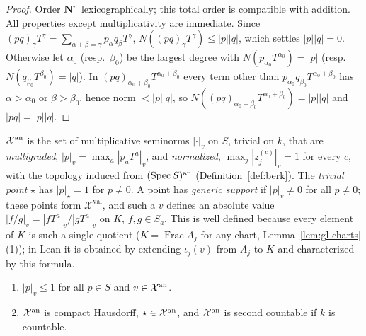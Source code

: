 \begin{proof}
Order $\mathbf{N}^r$ lexicographically; this total order is compatible with addition. All properties except multiplicativity are
immediate. Since $(pq)_\gamma T^\gamma=\sum_{\alpha+\beta=\gamma}p_\alpha q_\beta T^\gamma$, $N((pq)_\gamma T^\gamma)\le|p||q|$, which settles
$|p||q|=0$. Otherwise let $\alpha_0$ (resp.\ $\beta_0$) be the largest degree with $N(p_{\alpha_0}T^{\alpha_0})=|p|$ (resp.\
$N(q_{\beta_0}T^{\beta_0})=|q|$). In $(pq)_{\alpha_0+\beta_0}T^{\alpha_0+\beta_0}$ every term other than $p_{\alpha_0}q_{\beta_0}T^{\alpha_0+\beta_0}$ has
$\alpha>\alpha_0$ or $\beta>\beta_0$, hence norm $<|p||q|$, so $N((pq)_{\alpha_0+\beta_0}T^{\alpha_0+\beta_0})=|p||q|$ and $|pq|=|p||q|$.
\end{proof}

\begin{definition}[Points {\cite[\S2.1]{FHX}, \cite[\S1.1]{BJ22}}]\label{def:gl-points}
\leanok
{}
$\mathcal X^{\mathrm{an}}$ is the set of multiplicative seminorms $|\cdot|_v$ on $S$, trivial on $k$, that are \emph{multigraded},
$|p|_v=\max_a|p_aT^a|_v$, and \emph{normalized}, $\max_j|z^{(c)}_j|_v=1$ for every $c$, with the topology induced from
$(\operatorname{Spec} S)^{\mathrm{an}}$ (Definition~\ref{def:berk}). The \emph{trivial point} $\star$ has $|p|_\star=1$ for $p\ne0$. A point has
\emph{generic support} if $|p|_v\ne0$ for all $p\ne0$; these points form $\mathcal X^{\mathrm{val}}$, and such a $v$ defines
an absolute value $|f/g|_v=|fT^a|_v/|gT^a|_v$ on $K$, $f,g\in S_a$. This is well defined because every element of $K$ is such a
single quotient ($K=\operatorname{Frac}A_j$ for any chart, Lemma~\ref{lem:gl-charts}(1)); in Lean it is obtained by extending $\iota_j(v)$ from $A_j$
to $K$ and characterized by this formula.
\end{definition}

\begin{lemma}[Basic properties]\label{lem:gl-points-basic}
\leanok
{}
\begin{enumerate}
\item $|p|_v\le1$ for all $p\in S$ and $v\in\mathcal X^{\mathrm{an}}$.
\item $\mathcal X^{\mathrm{an}}$ is compact Hausdorff, $\star\in\mathcal X^{\mathrm{an}}$, and $\mathcal X^{\mathrm{an}}$ is second countable if $k$ is countable.
\end{enumerate}
\end{lemma}

